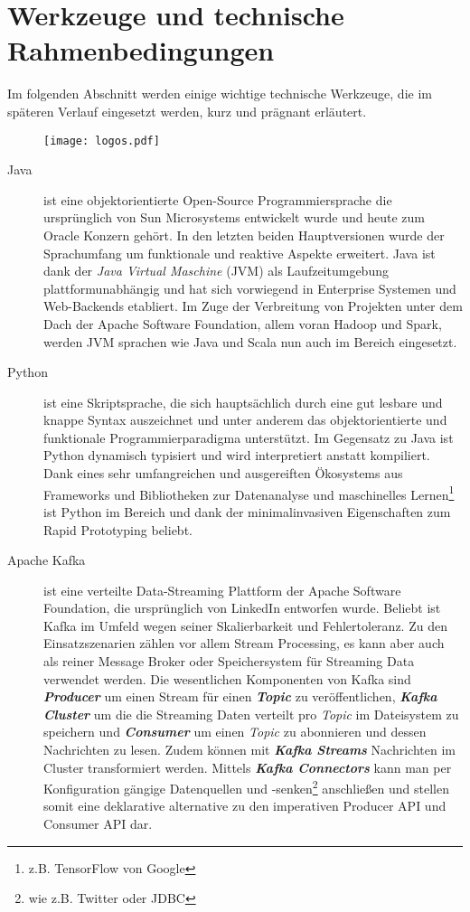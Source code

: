 \chapter{Werkzeuge und technische Rahmenbedingungen}
\label{chap:tools}
Im folgenden Abschnitt werden einige wichtige technische Werkzeuge, die im späteren Verlauf eingesetzt werden, kurz und prägnant erläutert.
\begin{figure}[h]
	\centering
	\texttt{[image: logos.pdf]}
	\label{fig:logos}
\end{figure}

\begin{description}
	\item [Java] ist eine objektorientierte Open-Source Programmiersprache die ursprünglich von Sun Microsystems entwickelt wurde und heute zum Oracle Konzern gehört. In den letzten beiden Hauptversionen wurde der Sprachumfang  um funktionale und reaktive Aspekte erweitert. Java ist dank der \textit{Java Virtual Maschine} (JVM) als Laufzeitumgebung plattformunabhängig und hat sich vorwiegend in Enterprise Systemen und Web-Backends etabliert.\autocite{java} Im Zuge der Verbreitung von \bd{} Projekten unter dem Dach der Apache Software Foundation, allem voran Hadoop und Spark, werden JVM sprachen wie Java und Scala nun auch im Bereich \bd{}  eingesetzt.\autocite{apacheProjects}
	\item [Python] ist eine \os{} Skriptsprache, die sich hauptsächlich durch eine gut lesbare und knappe Syntax auszeichnet und unter anderem das objektorientierte und funktionale Programmierparadigma unterstützt. Im Gegensatz zu Java ist Python dynamisch typisiert und wird interpretiert anstatt kompiliert.\autocite{wikiPython} Dank eines sehr umfangreichen und ausgereiften Ökosystems aus Frameworks und Bibliotheken\autocite{awesome-python} zur Datenanalyse und maschinelles Lernen\footnote{z.B. TensorFlow von Google} ist Python im Bereich \bd{} und dank der minimalinvasiven Eigenschaften zum Rapid Prototyping beliebt\autocite{quoraPython}.
	\item [Apache Kafka] ist eine verteilte Data-Streaming Plattform der Apache Software Foundation, die ursprünglich von LinkedIn entworfen wurde. Beliebt ist Kafka im \bd{} Umfeld wegen seiner Skalierbarkeit und Fehlertoleranz.  Zu den Einsatzszenarien zählen vor allem Stream Processing, es kann aber auch als reiner Message Broker oder Speichersystem für Streaming Data verwendet werden. Die wesentlichen Komponenten von Kafka sind \textbf{\textit{Producer}} um einen Stream für einen \textbf{\textit{Topic}} zu veröffentlichen, \textbf{\textit{Kafka Cluster}} um die die Streaming Daten verteilt pro \textit{Topic} im Dateisystem zu speichern und \textbf{\textit{Consumer}} um einen \textit{Topic} zu abonnieren und dessen Nachrichten zu lesen. Zudem können mit \textbf{\textit{Kafka Streams}} Nachrichten im Cluster transformiert werden. Mittels \textbf{\textit{Kafka Connectors}} kann man per Konfiguration gängige Datenquellen und -senken\footnote{wie z.B. Twitter oder JDBC} anschließen und stellen somit eine deklarative alternative zu den imperativen Producer \ac{API} und Consumer \ac{API} dar.

\end{description}
